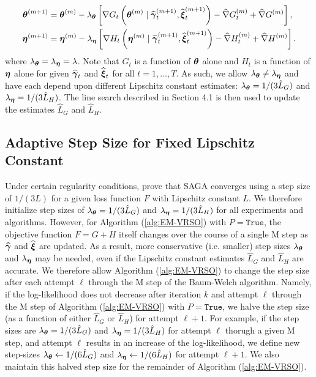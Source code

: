 \begin{align}
    \boldsymbol{\theta}^{(m+1)} &= \boldsymbol{\theta}^{(m)} - \lambda_{\boldsymbol{\theta}} \left[\nabla G_{t}\left(\boldsymbol{\theta}^{(m)} \mid \widehat {\boldsymbol{\gamma}}_{t}^{(m+1)}, \widehat {\boldsymbol{\xi}}_{t}^{(m+1)}\right) - \widehat \nabla G_{t}^{(m)} + \widehat \nabla G^{(m)} \right], \\
    \boldsymbol{\eta}^{(m+1)} &= \boldsymbol{\eta}^{(m)} - \lambda_{\boldsymbol{\eta}} \left[\nabla H_{t}\left(\boldsymbol{\eta}^{(m)} \mid \widehat {\boldsymbol{\gamma}}_{t}^{(m+1)}, \widehat {\boldsymbol{\xi}}_{t}^{(m+1)}\right) - \widehat \nabla H_{t}^{(m)} + \widehat \nabla H^{(m)} \right].
\end{align}
%
where $\lambda_{\boldsymbol{\theta}} = \lambda_{\boldsymbol{\eta}} = \lambda$. Note that $G_t$ is a function of $\boldsymbol{\theta}$ alone and $H_t$ is a function of $\boldsymbol{\eta}$ alone for given $\widehat {\boldsymbol{\gamma}}_{t}$ and $\widehat {\boldsymbol{\xi}}_{t}$ for all $t = 1,\ldots,T$. As such, we allow $\lambda_{\boldsymbol{\theta}} \neq \lambda_{\boldsymbol{\eta}}$ and have each depend upon different Lipschitz constant estimates: $\lambda_{\boldsymbol{\theta}} = 1/(3\hat L_G)$ and $\lambda_{\boldsymbol{\eta}} = 1/(3\hat L_H)$. The line search described in Section 4.1 is then used to update the estimates $\hat L_G$ and $\hat L_H$.

\subsection{Adaptive Step Size for Fixed Lipschitz Constant}
\label{subsec:L_divider}

Under certain regularity conditions, \citet{Defazio:2014} prove that SAGA converges using a step size of $1/(3L)$ for a given loss function $F$ with Lipschitz constant $L$. We therefore initialize step sizes of $\lambda_{\boldsymbol{\theta}} = 1/(3 \hat L_G)$ and $\lambda_{\boldsymbol{\eta}} = 1/(3 \hat L_H)$ for all experiments and algorithms. However, for Algorithm (\ref{alg:EM-VRSO}) with $P = \texttt{True}$, the objective function $F = G+H$ itself changes over the course of a single M step as $\widehat {\boldsymbol{\gamma}}$ and $\widehat {\boldsymbol{\xi}}$ are updated. As a result, more conservative (i.e. smaller) step sizes $\lambda_{\boldsymbol{\theta}}$ and $\lambda_{\boldsymbol{\eta}}$ may be needed, even if the Lipschitz constant estimates $\hat L_G$ and $\hat L_H$ are accurate. We therefore allow Algorithm (\ref{alg:EM-VRSO}) to change the step size after each attempt $\ell$ through the M step of the Baum-Welch algorithm. Namely, if the log-likelihood does not decrease after iteration $k$ and attempt $\ell$ through the M step of Algorithm (\ref{alg:EM-VRSO}) with $P = \texttt{True}$, we halve the step size (as a function of either $\hat L_G$ or $\hat L_H$) for attempt $\ell+1$. For example, if the step sizes are $\lambda_{\boldsymbol{\theta}} = 1/(3 \hat L_G)$ and $\lambda_{\boldsymbol{\eta}} = 1/(3 \hat L_H)$ for attempt $\ell$ thorugh a given M step, and attempt $\ell$ results in an increase of the log-likelihood, we define new step-sizes $\lambda_{\boldsymbol{\theta}} \leftarrow 1/(6 \hat L_G)$ and $\lambda_{\boldsymbol{\eta}} \leftarrow 1/(6 \hat L_H)$ for attempt $\ell+1$. We also maintain this halved step size for the remainder of Algorithm (\ref{alg:EM-VRSO}).


